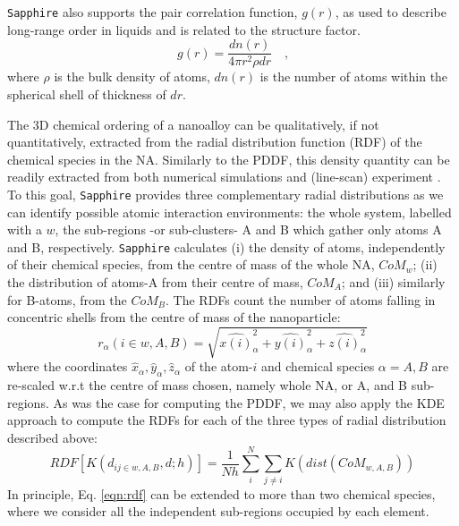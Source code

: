 \texttt{Sapphire} also supports the pair correlation function, $g(r)$, as used to describe long-range order in liquids \cite{10.1039/9781847558237} and is related to the structure factor.
%
\begin{equation}
    g\left( r \right) = \frac{ dn\left( r \right) }{ 4\pi r^{2}\rho dr } \mbox{~~~,}
    \label{eqn:gofr}
\end{equation}
%
where $\rho$ is the bulk density of atoms, $dn(r)$ is the number of atoms within the spherical shell of thickness of $dr$.


The 3D chemical ordering of a nanoalloy can be qualitatively, if not quantitatively, extracted from the radial distribution function (RDF) of the chemical species in the NA. %
Similarly to the PDDF, this density quantity can be readily extracted from both numerical simulations and (line-scan) experiment \cite{Neder_2005}.
%
To this goal, \texttt{Sapphire} provides three complementary radial distributions as we can identify possible atomic interaction environments: the whole system, labelled with a $w$, the sub-regions -or sub-clusters- A and B which gather only atoms A and B, respectively. \texttt{Sapphire} calculates (i) the density of atoms, independently of their chemical species, from the centre of mass of the whole NA, $CoM_w$; (ii) the distribution of atoms-A from their centre of mass, $CoM_A$; and (iii) similarly for B-atoms, from the $CoM_B$. 
%
The RDFs count the number of atoms falling in concentric shells from the centre of mass of the nanoparticle:
\begin{equation}
    r_{\alpha}(i \in w, A, B) = \sqrt{\hat{x(i)}_{\alpha}^2 + \hat{y(i)}_{\alpha}^2 + \hat{z(i)}_{\alpha}^2}
\end{equation}
where the coordinates $\hat{x}_{\alpha},\hat{y}_{\alpha},\hat{z}_{\alpha}$ of the atom-$i$ and chemical species $\alpha = A,B$ are re-scaled w.r.t the centre of mass chosen, namely whole NA, or A, and B sub-regions.
%
As was the case for computing the PDDF, we may also apply the KDE approach to compute the RDFs for each of the three types of radial distribution described above:
%
\begin{equation}
    RDF\left[K\left(d_{ij \in w, A, B},d;h\right)\right] = \frac{1}{Nh} \sum_{i}^{N} \sum_{j\neq i} K\left( dist (CoM_{w, A, B}) \right)
    \label{eqn:rdf}
\end{equation}
%
In principle, Eq. \ref{eqn:rdf} can be extended to more than two chemical species, where we consider all the independent sub-regions occupied by each element.
%

